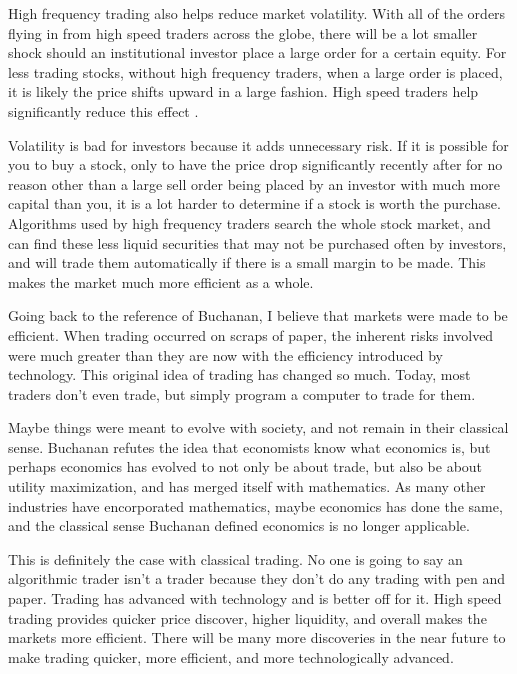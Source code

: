 \documentclass[11pt,]{article}
\begin{document}
High frequency trading also helps reduce market volatility. With all of
the orders flying in from high speed traders across the globe, there
will be a lot smaller shock should an institutional investor place a
large order for a certain equity. For less trading stocks, without high
frequency traders, when a large order is placed, it is likely the price
shifts upward in a large fashion. High speed traders help significantly
reduce this effect \citet{zhang2010high}.

Volatility is bad for investors because it adds unnecessary risk. If it
is possible for you to buy a stock, only to have the price drop
significantly recently after for no reason other than a large sell order
being placed by an investor with much more capital than you, it is a lot
harder to determine if a stock is worth the purchase. Algorithms used by
high frequency traders search the whole stock market, and can find these
less liquid securities that may not be purchased often by investors, and
will trade them automatically if there is a small margin to be made.
This makes the market much more efficient as a whole.

Going back to the reference of Buchanan, I believe that markets were
made to be efficient. When trading occurred on scraps of paper, the
inherent risks involved were much greater than they are now with the
efficiency introduced by technology. This original idea of trading has
changed so much. Today, most traders don't even trade, but simply
program a computer to trade for them.

Maybe things were meant to evolve with society, and not remain in their
classical sense. Buchanan refutes the idea that economists know what
economics is, but perhaps economics has evolved to not only be about
trade, but also be about utility maximization, and has merged itself
with mathematics. As many other industries have encorporated
mathematics, maybe economics has done the same, and the classical sense
Buchanan defined economics is no longer applicable.

This is definitely the case with classical trading. No one is going to
say an algorithmic trader isn't a trader because they don't do any
trading with pen and paper. Trading has advanced with technology and is
better off for it. High speed trading provides quicker price discover,
higher liquidity, and overall makes the markets more efficient. There
will be many more discoveries in the near future to make trading
quicker, more efficient, and more technologically advanced.

\newpage
\singlespacing 

\end{document}
